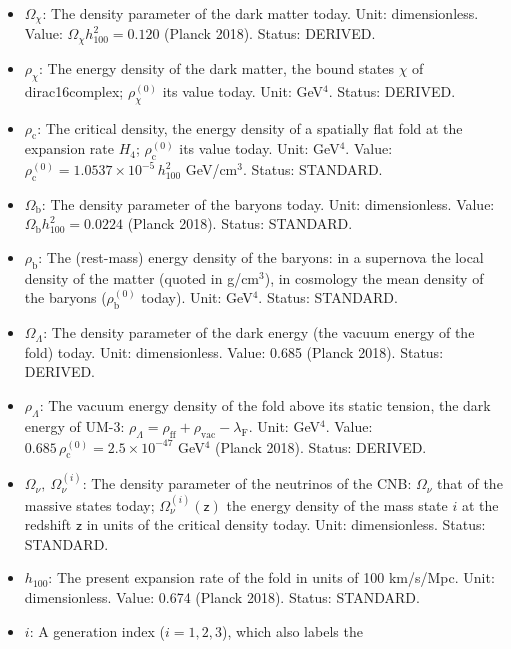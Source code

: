\documentclass[
  10pt,
]{article}
\providecommand{\tightlist}{%
  \setlength{\itemsep}{0pt}\setlength{\parskip}{0pt}}
\begin{document}
\begin{itemize}
\tightlist
\item
  \(\Omega_\chi\): The density parameter of the dark matter today. Unit:
  dimensionless. Value: \(\Omega_\chi h_{100}^2 = 0.120\) (Planck 2018).
  Status: DERIVED.
\item
  \(\rho_\chi\): The energy density of the dark matter, the bound states
  \(\chi\) of dirac16complex; \(\rho_\chi^{(0)}\) its value today. Unit:
  GeV\(^4\). Status: DERIVED.
\item
  \(\rho_{\mathrm{c}}\): The critical density, the energy density of a
  spatially flat fold at the expansion rate \(H_4\);
  \(\rho_{\mathrm{c}}^{(0)}\) its value today. Unit: GeV\(^4\). Value:
  \(\rho_{\mathrm{c}}^{(0)} = 1.0537\times10^{-5}\,h_{100}^2\)
  GeV/cm\(^3\). Status: STANDARD.
\item
  \(\Omega_{\mathrm{b}}\): The density parameter of the baryons today.
  Unit: dimensionless. Value: \(\Omega_{\mathrm{b}}h_{100}^2 = 0.0224\)
  (Planck 2018). Status: STANDARD.
\item
  \(\rho_{\mathrm{b}}\): The (rest-mass) energy density of the baryons:
  in a supernova the local density of the matter (quoted in g/cm\(^3\)),
  in cosmology the mean density of the baryons
  (\(\rho_{\mathrm{b}}^{(0)}\) today). Unit: GeV\(^4\). Status:
  STANDARD.
\item
  \(\Omega_\Lambda\): The density parameter of the dark energy (the
  vacuum energy of the fold) today. Unit: dimensionless. Value: 0.685
  (Planck 2018). Status: DERIVED.
\item
  \(\rho_\Lambda\): The vacuum energy density of the fold above its
  static tension, the dark energy of UM-3:
  \(\rho_\Lambda = \rho_{\mathrm{ff}} + \rho_{\mathrm{vac}} - \lambda_{\mathrm{F}}\).
  Unit: GeV\(^4\). Value:
  \(0.685\,\rho_{\mathrm{c}}^{(0)} = 2.5\times10^{-47}\) GeV\(^4\)
  (Planck 2018). Status: DERIVED.
\item
  \(\Omega_\nu,\ \Omega_\nu^{(i)}\): The density parameter of the
  neutrinos of the CNB: \(\Omega_\nu\) that of the massive states today;
  \(\Omega_\nu^{(i)}(\mathsf{z})\) the energy density of the mass state
  \(i\) at the redshift \(\mathsf{z}\) in units of the critical density
  today. Unit: dimensionless. Status: STANDARD.
\item
  \(h_{100}\): The present expansion rate of the fold in units of 100
  km/s/Mpc. Unit: dimensionless. Value: 0.674 (Planck 2018). Status:
  STANDARD.
\item
  \(i\): A generation index (\(i = 1, 2, 3\)), which also labels the

\end{itemize}
\end{document}
